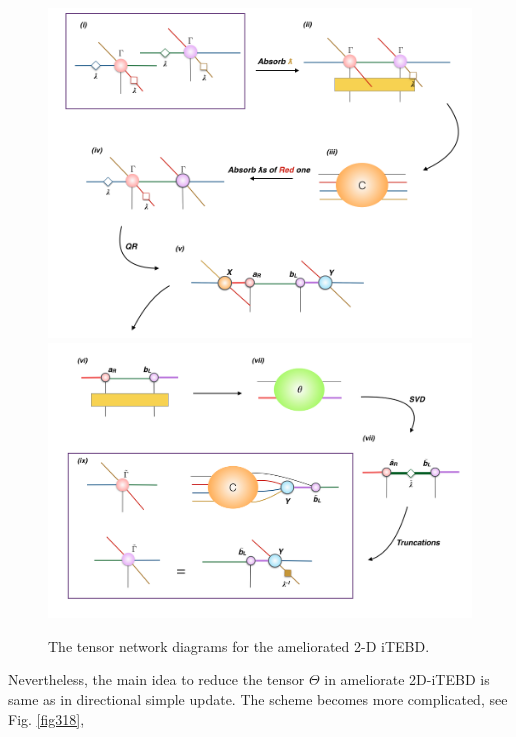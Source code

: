 \begin{figure}[!ht]
	\centering
	\includegraphics[width=1.00\textwidth]{figures/fig319.png}
	\includegraphics[width=1.00\textwidth]{figures/fig320.png}
	\caption[The tensor network diagrams for the ameliorated 2-D iTEBD with QR decompositiont]{The tensor network diagrams for the ameliorated 2-D iTEBD.}
	\label{fig319}
\end{figure}

Nevertheless, the main idea to reduce the tensor $\Theta$ in ameliorate 2D-iTEBD is same as in directional simple update. The scheme becomes more complicated, see Fig. \ref{fig318}, 

